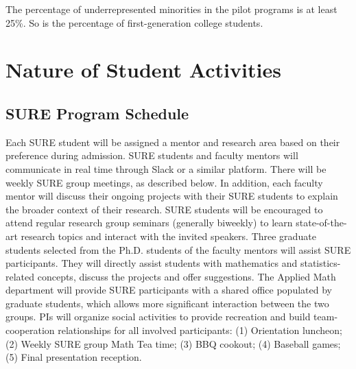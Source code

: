 \documentclass[11pt]{NSFamsart}
\begin{document}
 The percentage of underrepresented minorities in the pilot programs is at least 25\%. So is the percentage of first-generation college students.




\section{Nature of Student Activities}
\subsection{SURE Program Schedule}
\label{sec:SURESchedule}
Each SURE student will be
assigned a mentor and research area based on their preference during admission. SURE students and faculty
mentors will communicate in real time through Slack or a similar platform. There will be weekly SURE group meetings, as described below.  In addition, each
faculty mentor will discuss their ongoing projects with their SURE students to explain the broader context of their research. SURE students will be encouraged to attend regular research group seminars (generally biweekly) to learn state-of-the-art research topics and interact
with the invited speakers. Three graduate students selected from the Ph.D. students
of the faculty mentors will assist SURE participants. They will
directly assist students with mathematics and statistics-related
concepts, discuss the projects and offer suggestions. The Applied Math department will provide SURE participants with
a shared office populated by graduate students, which
allows more significant interaction between the two groups. 
PIs will organize social activities to provide recreation
and build team-cooperation relationships for all involved participants: (1) Orientation luncheon; (2) Weekly SURE group Math Tea time; (3) BBQ
cookout; (4) Baseball games;  (5)
 Final presentation reception.
\end{document}
